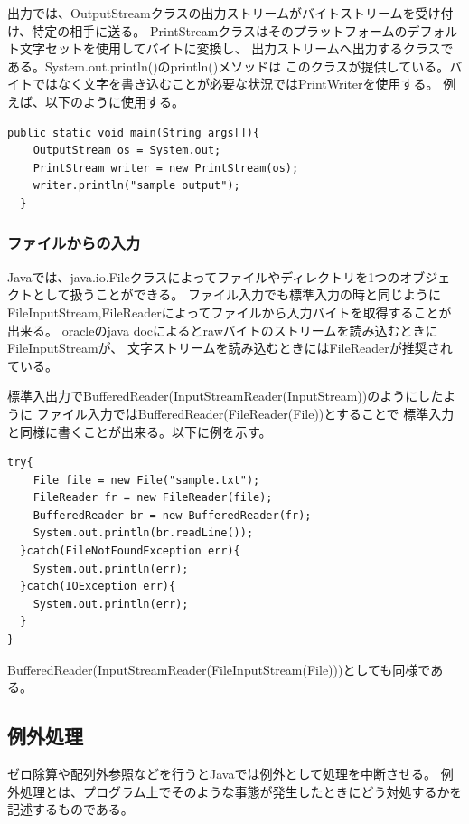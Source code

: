 \documentclass[dvipdfmx]{jsarticle}
\begin{document}
出力では、OutputStreamクラスの出力ストリームがバイトストリームを受け付け、特定の相手に送る。
PrintStreamクラスはそのプラットフォームのデフォルト文字セットを使用してバイトに変換し、
出力ストリームへ出力するクラスである。System.out.println()のprintln()メソッドは
このクラスが提供している。バイトではなく文字を書き込むことが必要な状況ではPrintWriterを使用する。
例えば、以下のように使用する。

\begin{lstlisting}[caption=1行出力]
  public static void main(String args[]){
    OutputStream os = System.out;
    PrintStream writer = new PrintStream(os);
    writer.println("sample output");
  }
\end{lstlisting}

\subsubsection{ファイルからの入力}

Javaでは、java.io.Fileクラスによってファイルやディレクトリを1つのオブジェクトとして扱うことができる。
ファイル入力でも標準入力の時と同じようにFileInputStream,FileReaderによってファイルから入力バイトを取得することが出来る。
oracleのjava docによるとrawバイトのストリームを読み込むときにFileInputStreamが、
文字ストリームを読み込むときにはFileReaderが推奨されている。

標準入出力でBufferedReader(InputStreamReader(InputStream))のようにしたように
ファイル入力ではBufferedReader(FileReader(File))とすることで
標準入力と同様に書くことが出来る。以下に例を示す。

\begin{lstlisting}[caption=ファイル入力]
  try{
    File file = new File("sample.txt");
    FileReader fr = new FileReader(file);
    BufferedReader br = new BufferedReader(fr);
    System.out.println(br.readLine());
  }catch(FileNotFoundException err){
    System.out.println(err);
  }catch(IOException err){
    System.out.println(err);
  }
}
\end{lstlisting}

BufferedReader(InputStreamReader(FileInputStream(File)))としても同様である。

\subsection{例外処理}

ゼロ除算や配列外参照などを行うとJavaでは例外として処理を中断させる。
例外処理とは、プログラム上でそのような事態が発生したときにどう対処するかを記述するものである。
\end{document}
